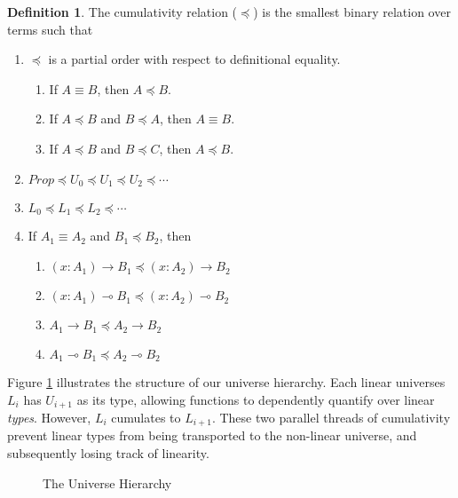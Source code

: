 \documentclass{article}
\theoremstyle{definition}
\newtheorem{definition}{Definition}[section]
\begin{document}
  \begin{definition}
    The cumulativity relation ($\preceq$) is the smallest binary relation over terms such that
    \begin{enumerate}
      \item $\preceq$ is a partial order with respect to definitional equality.
        \begin{enumerate}
          \item If $A \equiv B$, then $A \preceq B$.
          \item If $A \preceq B$ and $B \preceq A$, then $A \equiv B$.
          \item If $A \preceq B$ and $B \preceq C$, then $A \preceq B$.
        \end{enumerate}
      \item $Prop \preceq U_0 \preceq U_1 \preceq U_2 \preceq \cdots$
      \item $L_0 \preceq L_1 \preceq L_2 \preceq \cdots$
      \item If $A_1 \equiv A_2$ and $B_1 \preceq B_2$, then
        \begin{enumerate}
          \item $(x : A_1) \rightarrow B_1 \preceq (x : A_2) \rightarrow B_2$
          \item $(x : A_1) \multimap B_1 \preceq (x : A_2) \multimap B_2$
          \item $A_1 \rightarrow B_1 \preceq A_2 \rightarrow B_2$
          \item $A_1 \multimap B_1 \preceq A_2 \multimap B_2$
        \end{enumerate}
    \end{enumerate}
  \end{definition}

  Figure \ref{universe} illustrates the structure of our universe hierarchy. Each linear universes $L_i$ has $U_{i+1}$ as its type, allowing functions to dependently quantify over linear \textit{types}. However, $L_i$ cumulates to $L_{i+1}$. These two parallel threads of cumulativity prevent linear types from being transported to the non-linear universe, and subsequently losing track of linearity.

  \begin{figure}[H]
    \caption{The Universe Hierarchy}
    \centering
    \label{universe}
  \end{figure}
\end{document}
